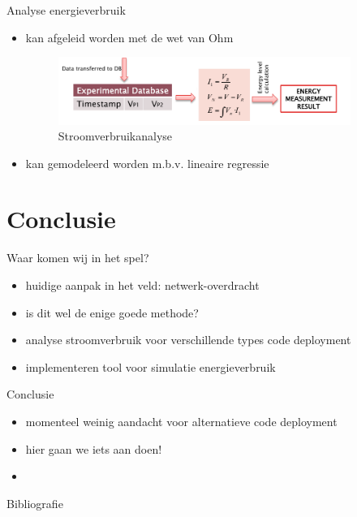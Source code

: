 \documentclass[presentation, bigger]{beamer}
\begin{document}
\begin{frame}[label=sec-3-5]{Analyse energieverbruik}
\begin{itemize}
\item kan afgeleid worden met de wet van Ohm
  \begin{figure}
    \centering
    \includegraphics[width=0.9\textwidth,keepaspectration=true]{elek/diag2}

    \caption{Stroomverbruikanalyse}
  \end{figure}
\item kan gemodeleerd worden m.b.v. lineaire regressie
\end{itemize}
\end{frame}
\section{Conclusie}
\label{sec-4}
\begin{frame}[label=sec-4-1]{Waar komen wij in het spel?}
\begin{itemize}
\item huidige aanpak in het veld: netwerk-overdracht
\item is dit wel de enige goede methode?
\item analyse stroomverbruik voor verschillende types code deployment
\item implementeren tool voor simulatie energieverbruik
\end{itemize}
\end{frame}

\begin{frame}[label=sec-4-2]{Conclusie}
  \begin{itemize}
  \item momenteel weinig aandacht voor alternatieve code deployment
  \item hier gaan we iets aan doen!
  \item 
  \end{itemize}
\end{frame}
\begin{frame}[allowframebreaks]{Bibliografie}
\nocite{*}
\printbibliography
\end{frame}

\end{document}
